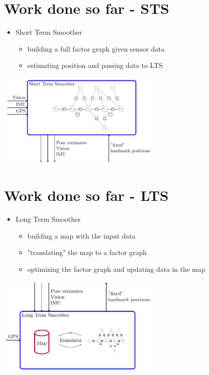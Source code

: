 \documentclass[%
    fourtothree=true, %
    DepLogo=true     %
    ]{ETHpres}
\begin{document}
%

\clearpage

\ETHslide
\section*{Work done so far - STS}
\begin{itemize}
	\item[\ETHitem] Short Term Smoother 
		\begin{itemize}
			\item building a full factor graph given sensor data
			\item estimating position and passing data to LTS
		\end{itemize}
\end{itemize}	

\begin{center}
\includegraphics[width=0.6\textwidth]{TikZ_drawings/STS/STS.pdf}\\	
\end{center}		
		
		
\clearpage

\ETHslide
\section*{Work done so far - LTS}
\begin{itemize}		
	\item[\ETHitem] Long Term Smoother
		\begin{itemize}
		 	\item building a map with the input data	
		 	\item "translating" the map to a factor graph
		 	\item optimizing the factor graph and updating data in the map
		\end{itemize}
\end{itemize}

\begin{center}
\includegraphics[width=0.6\textwidth]{TikZ_drawings/LTS/LTS.pdf}\\	
\end{center}		
\end{document}
